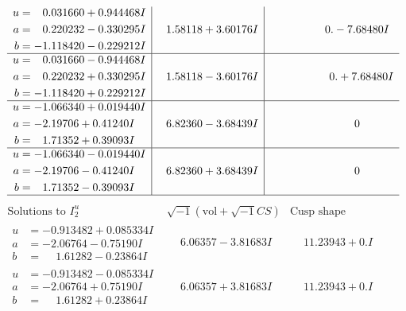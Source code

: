 \documentclass[1p]{elsarticle_modified}
\theoremstyle{definition}
\newcommand{\I}{\sqrt{-1}}
\begin{document}
$$\begin{array}{c|c|c}
\begin{aligned}
u &= \phantom{-}0.031660 + 0.944468 I \\
a &= \phantom{-}0.220232 - 0.330295 I \\
b &= -1.118420 - 0.229212 I\end{aligned}
 & \phantom{-}1.58118 + 3.60176 I & \phantom{-0.000000 } 0. - 7.68480 I \\ \hline\begin{aligned}
u &= \phantom{-}0.031660 - 0.944468 I \\
a &= \phantom{-}0.220232 + 0.330295 I \\
b &= -1.118420 + 0.229212 I\end{aligned}
 & \phantom{-}1.58118 - 3.60176 I & \phantom{-0.000000 -}0. + 7.68480 I \\ \hline\begin{aligned}
u &= -1.066340 + 0.019440 I \\
a &= -2.19706 + 0.41240 I \\
b &= \phantom{-}1.71352 + 0.39093 I\end{aligned}
 & \phantom{-}6.82360 - 3.68439 I & \phantom{-0.000000 } 0 \\ \hline\begin{aligned}
u &= -1.066340 - 0.019440 I \\
a &= -2.19706 - 0.41240 I \\
b &= \phantom{-}1.71352 - 0.39093 I\end{aligned}
 & \phantom{-}6.82360 + 3.68439 I & \phantom{-0.000000 } 0\\
 \hline 
 \end{array}$$\newpage$$\begin{array}{c|c|c}  
\text{Solutions to }I^u_{2}& \I (\text{vol} + \sqrt{-1}CS) & \text{Cusp shape}\\
 \hline 
\begin{aligned}
u &= -0.913482 + 0.085334 I \\
a &= -2.06764 - 0.75190 I \\
b &= \phantom{-}1.61282 - 0.23864 I\end{aligned}
 & \phantom{-}6.06357 - 3.81683 I & \phantom{-}11.23943 + 0. I\phantom{ +0.000000I} \\ \hline\begin{aligned}
u &= -0.913482 - 0.085334 I \\
a &= -2.06764 + 0.75190 I \\
b &= \phantom{-}1.61282 + 0.23864 I\end{aligned}
 & \phantom{-}6.06357 + 3.81683 I & \phantom{-}11.23943 + 0. I\phantom{ +0.000000I} \\ \hline\begin{aligned}

\end{aligned}
\end{array}$$
\end{document}
